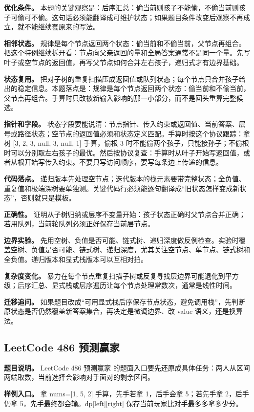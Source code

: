 \textbf{优化条件。} 本题的关键观察是：后序汇总：偷当前则孩子不能偷，不偷当前则孩子可偷可不偷。这句话必须能翻译成可维护状态；如果题目条件改变后观察不再成立，就不能继续套原来的写法。

\textbf{相邻状态。} 规律是每个节点返回两个状态：偷当前和不偷当前，父节点再组合。把这个特例继续拆开看：节点向父亲返回的量和全局答案通常不是同一个量。先写叶子或空节点的返回值，再写父节点如何合并左右孩子，递归式才有边界基础。

\textbf{状态复用。} 把对子树的重复扫描压成返回值或队列状态；每个节点只合并孩子给出的稳定信息。本题落点是：规律是每个节点返回两个状态：偷当前和不偷当前，父节点再组合。手算时只改被新输入影响的那一小部分，而不是回头重算完整候选。

\textbf{指针和字段。} 状态字段要能说清：节点指针、传入约束或返回值、当前答案、层号或路径状态；空节点的返回值必须和状态定义匹配。手算时按这个协议跟踪：拿树 [3, 2, 3, null, 3, null, 1] 手算，偷根 3 时不能偷两个孩子，只能接孙子；不偷根时可以分别取左右孩子的最优。然后按协议复查：手算时从叶子开始写返回值，或者从根开始写传入约束。不要只写访问顺序，要写每条边上传递的信息。

\textbf{代码落点。} 递归版本先处理空节点；迭代版本的栈元素要带完整状态；全负值、重复值和极端深树要单独测。关键代码行必须能逐句翻译成“旧状态怎样变成新状态”，否则就只是模板。

\textbf{正确性。} 证明从子树归纳或层序不变量开始：孩子状态正确时父节点合并正确；若用队列，当前轮队列必须正好保存当前层节点。

\textbf{边界实验。} 先用空树、负值是否可能、链式树、递归深度做反例检查。实验时覆盖空树、负值是否可能、链式树、递归深度，尤其关注空节点、单节点、链式树和全负值。递归版本和显式栈版本可以互相对拍。

\textbf{复杂度变化。} 暴力在每个节点重复扫描子树或反复寻找层边界可能退化到平方级；后序汇总、显式栈或层序遍历让每个节点处理常数次，通常是线性时间。

\textbf{迁移追问。} 如果题目改成“可用显式栈后序保存节点状态，避免调用栈”，先判断原状态是否仍然覆盖新答案集合，再决定是微调边界、改 value 语义，还是换算法。

\subsection{LeetCode 486 预测赢家}

\textbf{题目说明。} LeetCode 486 预测赢家 的题面入口要先还原成具体任务：两人从区间两端取数，当前选择会影响对手面对的剩余区间。

\textbf{样例入口。} 拿 nums=[1, 5, 2] 手算，先手若拿 1，后手会拿 5；若先手拿 2，后手仍拿 5，先手最终都会输。dp[left][right] 保存当前玩家比对手最多多拿多少分。

